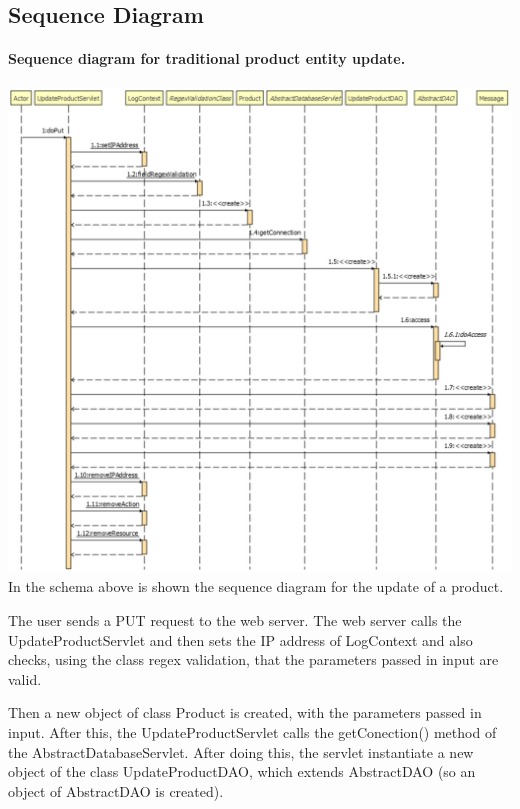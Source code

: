 \pagebreak
\subsection{Sequence Diagram}

\paragraph[]{Sequence diagram for traditional product entity update.} \hspace{1mm} \par
\includegraphics[width=\textwidth, keepaspectratio]{resources/updateproductsequence.pdf}
In the schema above is shown the sequence diagram for the update of a product. 

The user sends a PUT request to the web server. The web server calls the UpdateProductServlet and then sets the IP address of LogContext and also checks, using the class regex validation, that the parameters passed in input are valid.

Then a new object of class Product is created, with the parameters passed in input. After this, the UpdateProductServlet calls the getConection() method of the AbstractDatabaseServlet. After doing this, the servlet instantiate a new object of the class UpdateProductDAO, which extends AbstractDAO (so an object of AbstractDAO is created).

